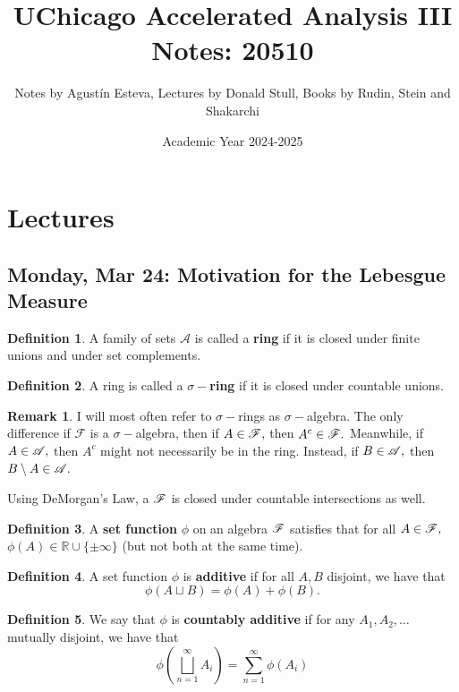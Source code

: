 \documentclass[10pt, oneside]{article}
\title{UChicago Accelerated Analysis III Notes: 20510}
\author{Notes by Agustín Esteva, Lectures by Donald Stull, Books by Rudin, Stein and Shakarchi}
\date{Academic Year 2024-2025}
\newcommand{\bbR}{\mathbb{R}}
\newcommand{\sm}{\setminus}
\theoremstyle{definition}
\newtheorem{defn}{Definition}
\newtheorem{rem}{Remark}
\begin{document}
\maketitle
\tableofcontents

\vspace{.25in}


\newpage
\section{Lectures}

\subsection{Monday, Mar 24: Motivation for the Lebesgue Measure}
\begin{defn}
    A family of sets $\mathcal{A}$ is called a \textbf{ring} if it is closed under finite unions and under set complements. 
\end{defn}
\begin{defn}
    A ring is called a \textbf{$\sigma-$ring} if it is closed under countable unions.
\end{defn}
\begin{rem}
    I will most often refer to $\sigma-$rings as $\sigma-$algebra. The only difference if $\mathcal{F}$ is a $\sigma-$algebra, then if $A \in \cal F,$ then $A^c \in \cal F.$ Meanwhile, if $A\in \cal A,$ then $A^c$ might not necessarily be in the ring. Instead, if $B \in \cal A,$ then $B\sm A \in \cal A.$  
\end{rem}
Using DeMorgan's Law, a $\cal F$ is closed under countable intersections as well. 
\begin{defn}
    A \textbf{set function} $\phi$ on an algebra $\cal F$ satisfies that for all $A \in \cal F,$ $\phi(A) \in \bbR \cup \{\pm \infty\}$ (but not both at the same time).
\end{defn}
\begin{defn}
A set function $\phi$ is \textbf{additive} if for all $A,B$ disjoint, we have that 
\[\phi(A\sqcup B) = \phi(A) + \phi(B).\]
\end{defn}
\begin{defn}
    We say that $\phi$ is \textbf{countably additive} if for any $A_1, A_2, \dots$ mutually disjoint, we have that 
    \[\phi\left(\bigsqcup_{n=1}^\infty A_i\right) = \sum_{n=1}^\infty \phi(A_i)\]
\end{defn}
\end{document}
